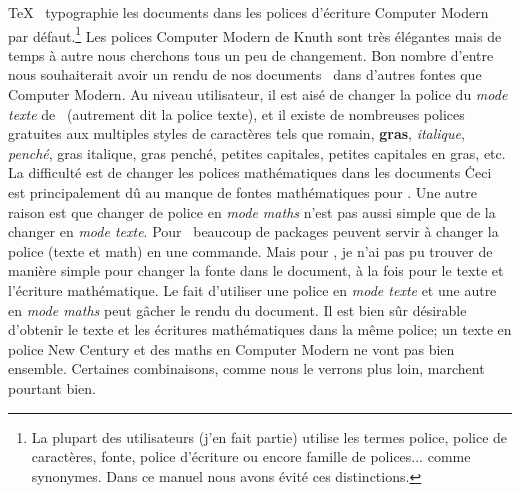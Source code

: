{\hbox{ \TeX\ }\vskip-14.5mm\ii {} typographie les documents dans les polices d'\'ecriture Computer Modern par d\'efaut.\footnote{La plupart des utilisateurs (j'en fait partie) utilise les termes {\eightit police}, {\eightit police de caract\`eres\/}, {\eightit fonte}, {\eightit police d'\'ecriture\/} ou encore {\eightit famille de polices...} comme synonymes. Dans ce manuel nous avons \'evit\'e ces distinctions.} Les polices Computer Modern de Knuth sont tr\`es \'el\'egantes mais de temps \`a autre nous cherchons tous un peu de changement. Bon nombre d'entre nous souhaiterait avoir un rendu de nos documents \capstex\ dans d'autres fontes que Computer Modern. Au niveau utilisateur, il est ais\'e de changer la police du {\sl mode texte} de \capstex\ (autrement dit la police texte), et il existe de nombreuses polices gratuites aux multiples styles de caract\`eres tels que {\rm romain}, {\bf gras}, {\it italique}, {\sl pench\'e}, {\itbf gras italique}, {\slbf gras pench\'e}, {\caps petites capitales}, {\capsbf petites capitales en gras}, etc. La difficult\'e est de changer les polices math\'ematiques dans les documents \capstex\. Ceci est principalement d\^u au manque de fontes math\'ematiques pour \capstex. Une autre raison est que changer de police en {\sl mode maths\/} n'est pas aussi simple que de la changer en {\sl mode texte}. Pour \capslatex\, beaucoup de packages peuvent servir \`a changer la police (texte et math) en une commande. Mais pour \capstex, je n'ai pas pu trouver de mani\`ere simple pour changer la fonte dans le document, \`a la fois pour le texte et l'\'ecriture math\'ematique. Le fait d'utiliser une police en {\sl mode texte\/} et une autre en {\sl mode maths\/} peut g\^acher le rendu du document. Il est bien s\^ur d\'esirable d'obtenir le texte et les \'ecritures math\'ematiques dans la m\^eme police; un texte en police New Century et des maths en Computer Modern ne vont pas bien ensemble. Certaines combinaisons, comme nous le verrons plus loin, marchent pourtant bien.

}
